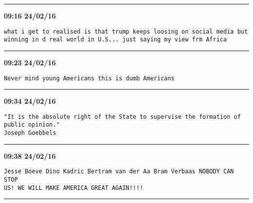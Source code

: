 \hrule%

\begin{adjustwidth}{0cm}{0cm}
\footnotesize \textbf{09:16 24/02/16}

\begin{lstlisting}[breaklines, breakatwhitespace, basicstyle=\small, frame=leftline]
what i get to realised is that trump keeps loosing on social media but winning in d real world in U.S... just saying my view frm Africa
\end{lstlisting}
\end{adjustwidth}

\hrule%

\begin{adjustwidth}{0cm}{0cm}
\footnotesize \textbf{09:23 24/02/16}

\begin{lstlisting}[breaklines, breakatwhitespace, basicstyle=\small, frame=leftline]
Never mind young Americans this is dumb Americans
\end{lstlisting}
\end{adjustwidth}

\hrule%

\begin{adjustwidth}{0cm}{0cm}
\footnotesize \textbf{09:34 24/02/16}

\begin{lstlisting}[breaklines, breakatwhitespace, basicstyle=\small, frame=leftline]
"It is the absolute right of the State to supervise the formation of public opinion."
Joseph Goebbels
\end{lstlisting}
\end{adjustwidth}

\hrule%

\begin{adjustwidth}{0cm}{0cm}
\footnotesize \textbf{09:38 24/02/16}

\begin{lstlisting}[breaklines, breakatwhitespace, basicstyle=\small, frame=leftline]
Jesse Boeve Dino Kadric Bertram van der Aa Bram Verbaas NOBODY CAN STOP 
US! WE WILL MAKE AMERICA GREAT AGAIN!!!!
\end{lstlisting}
\end{adjustwidth}

\hrule%

